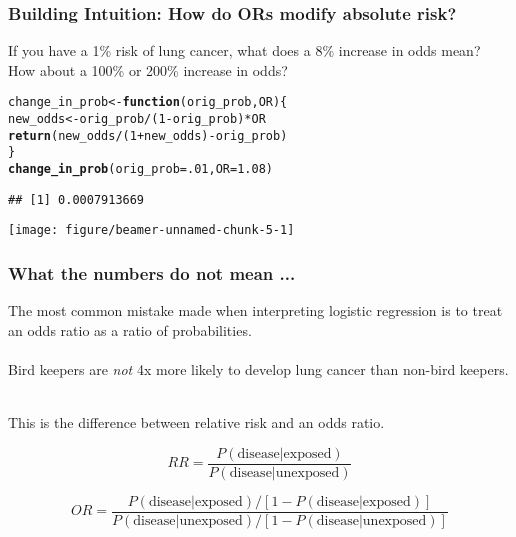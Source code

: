 \documentclass[table]{beamer}\usepackage[]{graphicx}\usepackage[]{color}
\makeatletter
\def\maxwidth{ %
  \ifdim\Gin@nat@width>\linewidth
    \linewidth
  \else
    \Gin@nat@width
  \fi
}
\newcommand{\hlnum}[1]{\textcolor[rgb]{0.686,0.059,0.569}{#1}}%
\newcommand{\hlopt}[1]{\textcolor[rgb]{0,0,0}{#1}}%
\newcommand{\hlstd}[1]{\textcolor[rgb]{0.345,0.345,0.345}{#1}}%
\newcommand{\hlkwa}[1]{\textcolor[rgb]{0.161,0.373,0.58}{\textbf{#1}}}%
\newcommand{\hlkwb}[1]{\textcolor[rgb]{0.69,0.353,0.396}{#1}}%
\newcommand{\hlkwc}[1]{\textcolor[rgb]{0.333,0.667,0.333}{#1}}%
\newcommand{\hlkwd}[1]{\textcolor[rgb]{0.737,0.353,0.396}{\textbf{#1}}}%
\newenvironment{kframe}{%
 \def\at@end@of@kframe{}%
 \ifinner\ifhmode%
  \def\at@end@of@kframe{\end{minipage}}%
  \begin{minipage}{\columnwidth}%
 \fi\fi%
 \def\FrameCommand##1{\hskip\@totalleftmargin \hskip-\fboxsep
 \colorbox{shadecolor}{##1}\hskip-\fboxsep
     \hskip-\linewidth \hskip-\@totalleftmargin \hskip\columnwidth}%
 \MakeFramed {\advance\hsize-\width
   \@totalleftmargin\z@ \linewidth\hsize
   \@setminipage}}%
 {\par\unskip\endMakeFramed%
 \at@end@of@kframe}
\newenvironment{knitrout}{}{} %
\makeatother
\begin{document}
\begin{frame}[fragile]
\frametitle{Building Intuition: How do ORs modify absolute risk?}

If you have a 1\% risk of lung cancer, what does a 8\% increase in odds mean? How about a 100\% or 200\% increase in odds?

\begin{knitrout}\scriptsize
{}\color{fgcolor}\begin{kframe}
\begin{alltt}
\hlstd{change_in_prob} \hlkwb{<-} \hlkwa{function}\hlstd{(}\hlkwc{orig_prob}\hlstd{,} \hlkwc{OR}\hlstd{)\{}
    \hlstd{new_odds} \hlkwb{<-} \hlstd{orig_prob} \hlopt{/} \hlstd{(}\hlnum{1}\hlopt{-}\hlstd{orig_prob)} \hlopt{*} \hlstd{OR}
    \hlkwd{return}\hlstd{( new_odds}\hlopt{/}\hlstd{(}\hlnum{1}\hlopt{+}\hlstd{new_odds)} \hlopt{-} \hlstd{orig_prob)}
\hlstd{\}}
\hlkwd{change_in_prob}\hlstd{(}\hlkwc{orig_prob}\hlstd{=}\hlnum{.01}\hlstd{,} \hlkwc{OR}\hlstd{=}\hlnum{1.08}\hlstd{)}
\end{alltt}
\begin{verbatim}
## [1] 0.0007913669
\end{verbatim}
\end{kframe}
\end{knitrout}

\begin{knitrout}\scriptsize
{}\color{fgcolor}

{\centering \texttt{[image: figure/beamer-unnamed-chunk-5-1]} 

}



\end{knitrout}




\end{frame}






\begin{frame}
\frametitle{What the numbers do not mean ...}

The most common mistake made when interpreting logistic regression is to treat an odds ratio as a ratio of probabilities.\\

~\\ 

Bird keepers are \emph{not} 4x more likely to develop lung cancer than non-bird keepers.

~\\ 

This is the difference between relative risk and an odds ratio.


\[RR = \frac{P(\text{disease} | \text{exposed})}{P(\text{disease} | \text{unexposed})} \]

\[OR = \frac{P(\text{disease} | \text{exposed}) / [1-P(\text{disease} | \text{exposed})]}{P(\text{disease} | \text{unexposed})/[1-P(\text{disease} | \text{unexposed})]} \]


\end{frame}
\end{document}

